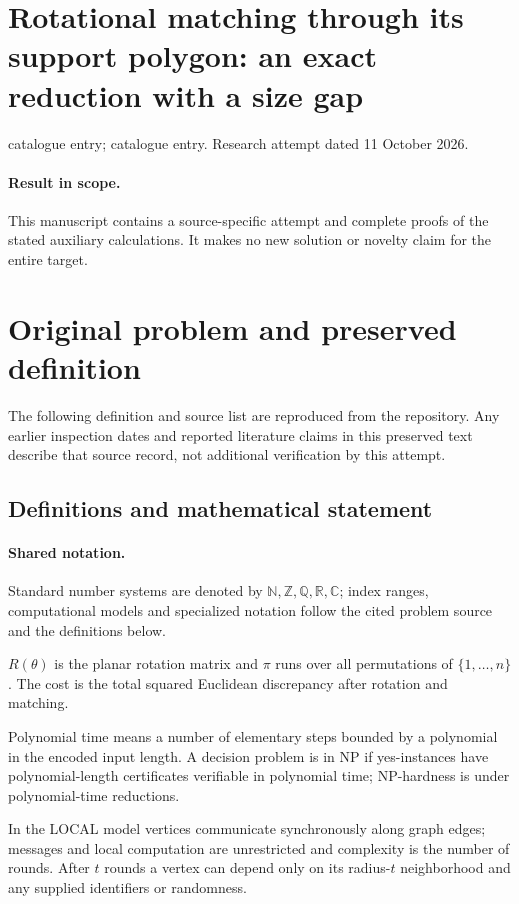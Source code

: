 \documentclass[11pt]{article}
\begin{document}
\section*{Rotational matching through its support polygon: an exact reduction with a size gap}
\noindent catalogue entry; catalogue entry. Research attempt dated 11 October 2026.
\paragraph{Result in scope.}This manuscript contains a source-specific attempt and complete proofs of the stated auxiliary calculations. It makes no new solution or novelty claim for the entire target.
\section{Original problem and preserved definition}
The following definition and source list are reproduced from the repository. Any earlier inspection dates and reported literature claims in this preserved text describe that source record, not additional verification by this attempt.
\subsection{Definitions and mathematical statement}

\paragraph{Shared notation.}Standard number systems are denoted by $\mathbb N,\mathbb Z,\mathbb Q,\mathbb R,\mathbb C$; index ranges, computational models and specialized notation follow the cited problem source and the definitions below.


$R(\theta)$ is the planar rotation matrix and $\pi$ runs over all permutations of $\{1,\ldots,n\}$. The cost is the total squared Euclidean discrepancy after rotation and matching.

Polynomial time means a number of elementary steps bounded by a polynomial in the encoded input length. A decision problem is in $\mathrm{NP}$ if yes-instances have polynomial-length certificates verifiable in polynomial time; NP-hardness is under polynomial-time reductions.

In the LOCAL model vertices communicate synchronously along graph edges; messages and local computation are unrestricted and complexity is the number of rounds. After $t$ rounds a vertex can depend only on its radius-$t$ neighborhood and any supplied identifiers or randomness.
\end{document}
